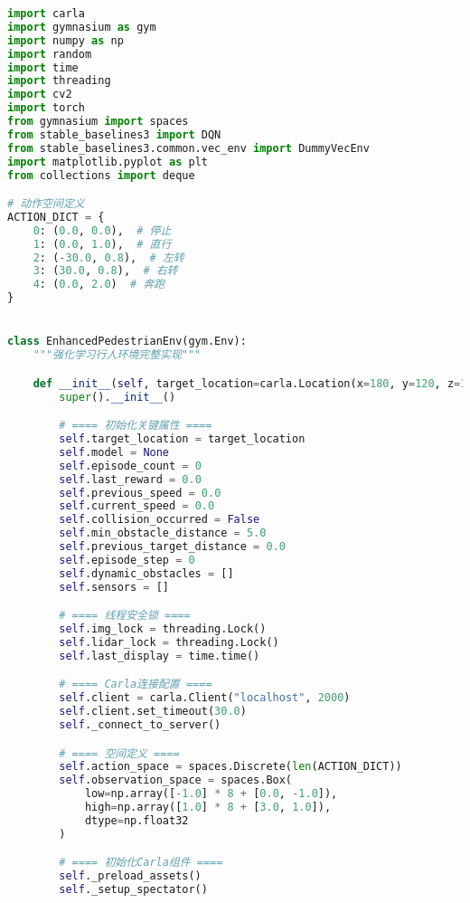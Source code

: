 \begin{lstlisting}[language=Python]
import carla
import gymnasium as gym
import numpy as np
import random
import time
import threading
import cv2
import torch
from gymnasium import spaces
from stable_baselines3 import DQN
from stable_baselines3.common.vec_env import DummyVecEnv
import matplotlib.pyplot as plt
from collections import deque

# 动作空间定义
ACTION_DICT = {
    0: (0.0, 0.0),  # 停止
    1: (0.0, 1.0),  # 直行
    2: (-30.0, 0.8),  # 左转
    3: (30.0, 0.8),  # 右转
    4: (0.0, 2.0)  # 奔跑
}


class EnhancedPedestrianEnv(gym.Env):
    """强化学习行人环境完整实现"""

    def __init__(self, target_location=carla.Location(x=180, y=120, z=1)):
        super().__init__()

        # ==== 初始化关键属性 ====
        self.target_location = target_location
        self.model = None
        self.episode_count = 0
        self.last_reward = 0.0
        self.previous_speed = 0.0
        self.current_speed = 0.0
        self.collision_occurred = False
        self.min_obstacle_distance = 5.0
        self.previous_target_distance = 0.0
        self.episode_step = 0
        self.dynamic_obstacles = []
        self.sensors = []

        # ==== 线程安全锁 ====
        self.img_lock = threading.Lock()
        self.lidar_lock = threading.Lock()
        self.last_display = time.time()

        # ==== Carla连接配置 ====
        self.client = carla.Client("localhost", 2000)
        self.client.set_timeout(30.0)
        self._connect_to_server()

        # ==== 空间定义 ====
        self.action_space = spaces.Discrete(len(ACTION_DICT))
        self.observation_space = spaces.Box(
            low=np.array([-1.0] * 8 + [0.0, -1.0]),
            high=np.array([1.0] * 8 + [3.0, 1.0]),
            dtype=np.float32
        )

        # ==== 初始化Carla组件 ====
        self._preload_assets()
        self._setup_spectator()


\end{lstlisting}
